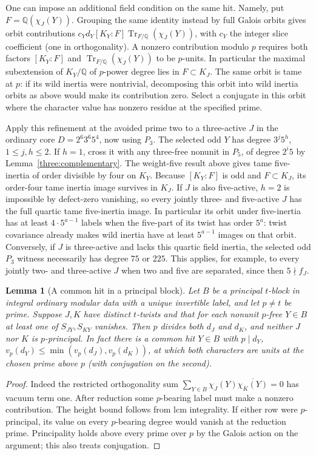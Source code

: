 \documentclass[11pt,a4paper]{article}
\numberwithin{equation}{section}
\newtheorem{lemma}[theorem]{Lemma}
\theoremstyle{remark}
\newcommand{\QQ}{\mathbb Q}
\begin{document}
One can impose an additional field condition on the same hit. Namely,
put $F=\QQ(\chi_J(Y))$. Grouping the same identity instead by full
Galois orbits gives orbit contributions
$c_Y d_Y [K_Y:F]\operatorname{Tr}_{F/\QQ}(\chi_J(Y))$, with
$c_Y$ the integer slice coefficient (one in orthogonality). A
nonzero contribution modulo $p$ requires both factors
$[K_Y:F]$ and $\operatorname{Tr}_{F/\QQ}(\chi_J(Y))$ to be
$p$-units. In particular the maximal subextension of $K_Y/\QQ$
of $p$-power degree lies in $F\subset K_J$. The same orbit is
tame at $p$: if its wild inertia were nontrivial, decomposing this
orbit into wild inertia orbits as above would make its contribution
zero. Select a conjugate in this orbit where the character value
has nonzero residue at the specified prime.

Apply this refinement at the avoided prime two to a three-active
$J$ in the ordinary core $D=2^6 3^6 5^4$, now using $P_3$.
The selected odd $Y$ has degree $3^j5^h$, $1\le j,h\le2$.
If $h=1$, cross it with any three-free nonunit in $P_5$,
of degree $2^i5$ by Lemma~\ref{three:complementary}. The weight-five result
above gives tame five-inertia of order divisible by four on $K_Y$.
Because $[K_Y:F]$ is odd and $F\subset K_J$, its order-four
tame inertia image survives in $K_J$. If $J$ is also five-active,
$h=2$ is impossible by defect-zero vanishing, so every jointly
three- and five-active $J$ has the full quartic tame five-inertia
image. In particular its orbit under five-inertia has at least
$4\cdot5^{a-1}$ labels when the five-part of its twist has order
$5^a$: twist covariance already makes wild inertia have at least
$5^{a-1}$ images on that orbit. Conversely, if $J$ is three-active
and lacks this quartic field inertia, the selected odd $P_3$ witness
necessarily has degree $75$ or $225$. This applies, for example, to
every jointly two- and three-active $J$ when two and five are
separated, since then $5\nmid f_J$.
\begin{lemma}[A common hit in a principal block]\label{u2:block-transfer}
Let $B$ be a principal $t$-block in integral ordinary modular data
with a unique invertible label, and let $p\ne t$ be prime. Suppose
$J,K$ have distinct $t$-twists and that for each nonunit $p$-free
$Y\in B$ at least one of $S_{JY},S_{KY}$ vanishes. Then $p$
divides both $d_J$ and $d_K$, and neither $J$ nor $K$ is
$p$-principal. In fact there is a common hit $Y\in B$ with $p\mid d_Y$,
$v_p(d_Y)\le\min(v_p(d_J),v_p(d_K))$, at which both characters are
units at the chosen prime above $p$ (with conjugation on the second).
\end{lemma}
\begin{proof}
Indeed the restricted orthogonality sum
$\sum_{Y\in B}\chi_J(Y)\overline{\chi_K(Y)}=0$ has vacuum term one.
After reduction some $p$-bearing label must make a nonzero contribution.
The height bound follows from lcm integrality. If either row were
$p$-principal, its value on every $p$-bearing degree would vanish
at the reduction prime. Principality holds above every prime over $p$
by the Galois action on the argument; this also treats conjugation.
\end{proof}
\end{document}
